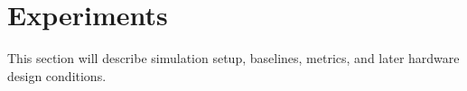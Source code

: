 \section{Experiments}

This section will describe simulation setup, baselines, metrics, and later hardware design conditions.
